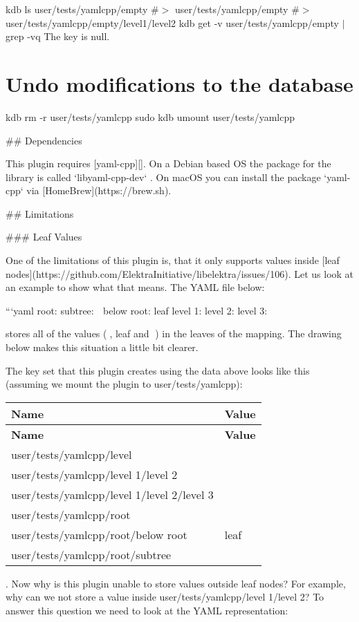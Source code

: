 kdb ls user/tests/yamlcpp/empty \#$>$ user/tests/yamlcpp/empty \#$>$ user/tests/yamlcpp/empty/level1/level2 kdb get -\/v user/tests/yamlcpp/empty $\vert$ grep -\/vq \textquotesingle{}The key is null.\textquotesingle{}

\section*{Undo modifications to the database}

kdb rm -\/r user/tests/yamlcpp sudo kdb umount user/tests/yamlcpp 
\begin{DoxyCode}
## Dependencies

This plugin requires [yaml-cpp][]. On a Debian based OS the package for the library is called
       `libyaml-cpp-dev` . On macOS you can install the package `yaml-cpp` via [HomeBrew](https://brew.sh).

## Limitations

### Leaf Values

One of the limitations of this plugin is, that it only supports values inside [leaf
       nodes](https://github.com/ElektraInitiative/libelektra/issues/106). Let us look at an example to show what that means. The YAML
       file below:

```yaml
root:
  subtree:    🍂
  below root: leaf
level 1:
  level 2:
    level 3:  🍁
\end{DoxyCode}


stores all of the values ({\ttfamily 🍂}, {\ttfamily leaf} and {\ttfamily 🍁}) in the leaves of the mapping. The drawing below makes this situation a little bit clearer.



The key set that this plugin creates using the data above looks like this (assuming we mount the plugin to {\ttfamily user/tests/yamlcpp})\+:

\tabulinesep=1mm
\begin{longtabu} spread 0pt [c]{*{2}{|X[-1]}|}
\hline
\rowcolor{\tableheadbgcolor}\textbf{ Name }&\textbf{ Value  }\\
\endfirsthead
\hline
\endfoot
\hline
\rowcolor{\tableheadbgcolor}\textbf{ Name }&\textbf{ Value  }\\
\endhead
user/tests/yamlcpp/level &\\
user/tests/yamlcpp/level 1/level 2 &\\
user/tests/yamlcpp/level 1/level 2/level 3 &🍁 \\
user/tests/yamlcpp/root &\\
user/tests/yamlcpp/root/below root &leaf \\
user/tests/yamlcpp/root/subtree &🍂 \\
\end{longtabu}
. Now why is this plugin unable to store values outside leaf nodes? For example, why can we not store a value inside {\ttfamily user/tests/yamlcpp/level 1/level 2}? To answer this question we need to look at the Y\+A\+ML representation\+:


